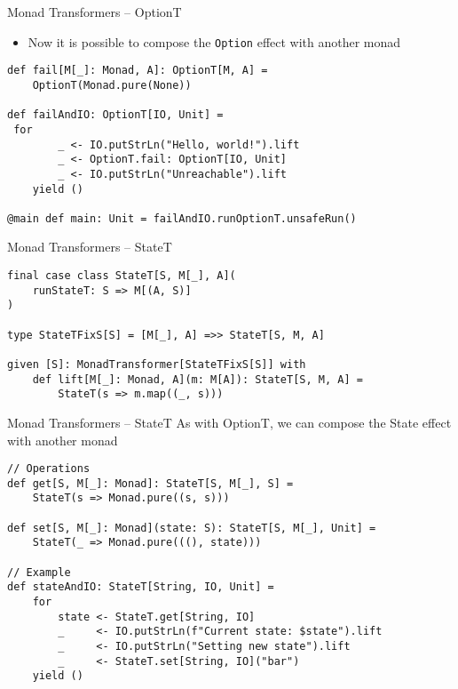 \documentclass[presentation, 10pt]{beamer}\mode<presentation>{\usetheme{metropolis}}
\begin{document}
\begin{frame}[fragile]{Monad Transformers -- OptionT}
\begin{itemize}
	\item Now it is possible to compose the \texttt{Option} effect with another monad
\end{itemize}
\begin{tcolorbox}
\begin{verbatim}
def fail[M[_]: Monad, A]: OptionT[M, A] = 
	OptionT(Monad.pure(None)) 

def failAndIO: OptionT[IO, Unit] = 
 for 
 		_ <- IO.putStrLn("Hello, world!").lift 
		_ <- OptionT.fail: OptionT[IO, Unit] 
		_ <- IO.putStrLn("Unreachable").lift 
	yield ()	

@main def main: Unit = failAndIO.runOptionT.unsafeRun()
\end{verbatim}
\end{tcolorbox}
\end{frame}
\begin{frame}[fragile]{Monad Transformers -- StateT}
\begin{center}	
\begin{tcolorbox}
\begin{verbatim}
final case class StateT[S, M[_], A](
	runStateT: S => M[(A, S)]
)

type StateTFixS[S] = [M[_], A] =>> StateT[S, M, A]

given [S]: MonadTransformer[StateTFixS[S]] with
	def lift[M[_]: Monad, A](m: M[A]): StateT[S, M, A] =
		StateT(s => m.map((_, s)))
\end{verbatim}
\end{tcolorbox}
\end{center}
\end{frame}
\begin{frame}[fragile]{Monad Transformers -- StateT}
As with OptionT, we can compose the State effect with another monad
\begin{tcolorbox}
\begin{verbatim}
// Operations
def get[S, M[_]: Monad]: StateT[S, M[_], S] =
	StateT(s => Monad.pure((s, s)))

def set[S, M[_]: Monad](state: S): StateT[S, M[_], Unit] =
	StateT(_ => Monad.pure(((), state)))

// Example
def stateAndIO: StateT[String, IO, Unit] =
	for
		state <- StateT.get[String, IO]
		_     <- IO.putStrLn(f"Current state: $state").lift
		_     <- IO.putStrLn("Setting new state").lift
		_     <- StateT.set[String, IO]("bar")
	yield ()
\end{verbatim}
\end{tcolorbox}
\end{frame}
\end{document}
